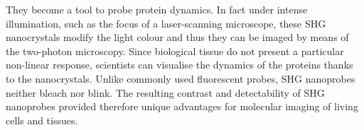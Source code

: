         They become a tool to probe protein dynamics. In fact under intense illumination, such as the focus of a laser-scanning microscope, these SHG nanocrystals modify the light colour and thus they can be imaged by means of the two-photon microscopy. Since biological tissue do not present a particular non-linear response, scientists can visualise the dynamics of the proteins thanks to the nanocrystals.        
        Unlike commonly used fluorescent probes, SHG nanoprobes neither bleach nor blink. The resulting contrast and detectability of SHG nanoprobes provided therefore unique advantages for molecular imaging of living cells and tissues. \cite{pantazis2010second}

